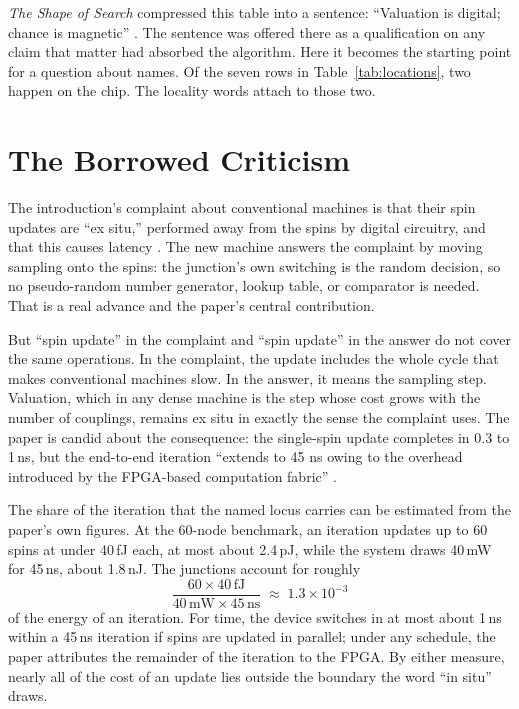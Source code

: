 \documentclass[11pt]{article}
\theoremstyle{definition}
\theoremstyle{remark}
\begin{document}
\emph{The Shape of Search} compressed this table into a sentence: ``Valuation is digital; chance is magnetic'' \cite{flyxion-shape}. The sentence was offered there as a qualification on any claim that matter had absorbed the algorithm. Here it becomes the starting point for a question about names. Of the seven rows in Table~\ref{tab:locations}, two happen on the chip. The locality words attach to those two.

\section{The Borrowed Criticism}

The introduction's complaint about conventional machines is that their spin updates are ``ex situ,'' performed away from the spins by digital circuitry, and that this causes latency \cite{li2026}. The new machine answers the complaint by moving sampling onto the spins: the junction's own switching is the random decision, so no pseudo-random number generator, lookup table, or comparator is needed. That is a real advance and the paper's central contribution.

But ``spin update'' in the complaint and ``spin update'' in the answer do not cover the same operations. In the complaint, the update includes the whole cycle that makes conventional machines slow. In the answer, it means the sampling step. Valuation, which in any dense machine is the step whose cost grows with the number of couplings, remains ex situ in exactly the sense the complaint uses. The paper is candid about the consequence: the single-spin update completes in 0.3 to 1\,ns, but the end-to-end iteration ``extends to 45 ns owing to the overhead introduced by the FPGA-based computation fabric'' \cite{li2026}.

The share of the iteration that the named locus carries can be estimated from the paper's own figures. At the 60-node benchmark, an iteration updates up to 60 spins at under 40\,fJ each, at most about 2.4\,pJ, while the system draws 40\,mW for 45\,ns, about 1.8\,nJ. The junctions account for roughly
\begin{equation}
\frac{60 \times 40\,\text{fJ}}{40\,\text{mW} \times 45\,\text{ns}} \;\approx\; 1.3 \times 10^{-3}
\end{equation}
of the energy of an iteration. For time, the device switches in at most about 1\,ns within a 45\,ns iteration if spins are updated in parallel; under any schedule, the paper attributes the remainder of the iteration to the FPGA. By either measure, nearly all of the cost of an update lies outside the boundary the word ``in situ'' draws.
\end{document}
